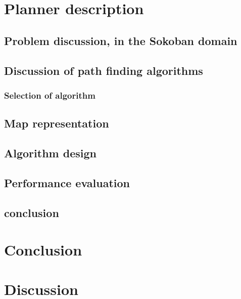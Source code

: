 \documentclass[draft, english, a4paper]{article}
\begin{document}
\chapter{Planner description}
	\section{Problem discussion, in the Sokoban domain} %
	\section{Discussion of path finding algorithms} %
		\subsection{Selection of algorithm}
	\section{Map representation} %
	\section{Algorithm design}
	\section{Performance evaluation}
	\section{conclusion}
\chapter{Conclusion}
\chapter{Discussion}
\appendix
\end{document}

